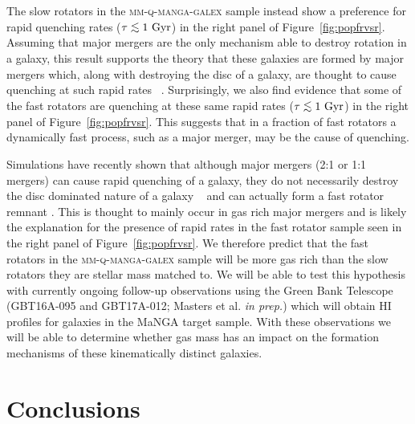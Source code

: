 \documentclass[useAMS,usenatbib]{mn2e}
\def\lesssim{\mathrel{\hbox{\rlap{\hbox{\lower3pt\hbox{$\sim$}}}\hbox{\raise2pt\hbox{$<$}}}}}
\def\refcol		{\color{refcol}}
\begin{document}
The slow rotators in the \textsc{mm-q-manga-galex} sample instead show a preference for rapid quenching rates ($\tau\lesssim1~\rm{Gyr}$) in the right panel of Figure~\ref{fig:popfrvsr}. Assuming that major mergers are the only mechanism able to destroy rotation in a galaxy, this result supports the theory that these galaxies are formed by major mergers which, along with destroying the disc of a galaxy, are thought to cause quenching at such rapid rates ~\citep{springel05b, bell06, lotz08b,lotz11}. Surprisingly, we also find evidence that some of the fast rotators are quenching at these same rapid rates ($\tau \lesssim 1~\rm{Gyr}$) in the right panel of Figure~\ref{fig:popfrvsr}. This suggests that in a fraction of fast rotators a dynamically fast process, such as a major merger, may be the cause of quenching. 

Simulations have recently shown that although major mergers (2:1 or 1:1 mergers) can cause rapid quenching of a galaxy, they do not necessarily destroy the disc dominated nature of a galaxy ~\citep{pontzen16, sparre16} and can actually form a fast rotator remnant \citep{bois11}. This is thought to mainly occur in gas rich major mergers \citep{bois11} and is likely the explanation for the presence of rapid rates in the fast rotator sample seen in the right panel of Figure~\ref{fig:popfrvsr}. We therefore predict that the fast rotators in the \textsc{mm-q-manga-galex} sample will be more gas rich than the slow rotators they are stellar mass matched to. We will be able to test this hypothesis with currently ongoing follow-up observations using the Green Bank Telescope (GBT16A-095 and GBT17A-012; {\refcol Masters et al. \emph{in prep.}}) which will obtain HI profiles for galaxies in the MaNGA target sample. With these observations we will be able to determine whether gas mass has an impact on the formation mechanisms of these kinematically distinct galaxies. 


\section{Conclusions}
\end{document}
